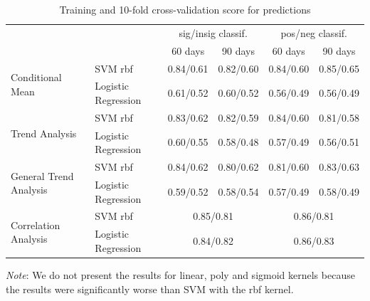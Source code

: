 \documentclass{vldb}
\begin{document}
\begin{table}[ht!]
\centering
\begin{tabular}{@{}llrrrr@{}}
\toprule
                                                              &                     & \multicolumn{2}{c}{sig/insig classif.} & \multicolumn{2}{c}{pos/neg classif.} \\ 
\cmidrule(r){3-4}
\cmidrule(r){5-6}
                                                              &                     & \multicolumn{1}{c}{60 days} & \multicolumn{1}{c}{90 days} & \multicolumn{1}{c}{60 days} & \multicolumn{1}{c}{90 days} \\ \midrule
\multirow{2}{*}{Conditional Mean}  & SVM rbf             &   0.84/0.61   &  0.82/0.60  & 0.84/0.60 &  0.85/0.65  \\
                                        & Logistic Regression & 0.61/0.52  & 0.60/0.52 &  0.56/0.49   &  0.56/0.49   \\ \midrule
\multirow{2}{*}{Trend Analysis}       & SVM rbf             & 0.83/0.62    &  0.82/0.59 & 0.84/0.60 & 0.81/0.58   \\
                                        & Logistic Regression &  0.60/0.55   & 0.58/0.48 &  0.57/0.49  &  0.56/0.51   \\ \midrule
\multirow{2}{*}{General Trend Analysis} & SVM rbf             & 0.84/0.62 & 0.80/0.62 &  0.81/0.60 &  0.83/0.63  \\
                                       & Logistic Regression &  0.59/0.52  & 0.58/0.54  &   0.57/0.49  &   0.58/0.49       \\ \midrule
\multirow{2}{*}{Correlation Analysis}   & SVM rbf             & \multicolumn{2}{c}{0.85/0.81}  & \multicolumn{2}{c}{0.86/0.81} \\
                                        & Logistic Regression & \multicolumn{2}{c}{0.84/0.82}  & \multicolumn{2}{c}{0.86/0.83} \\
\bottomrule
\end{tabular}
\caption{Training and 10-fold cross-validation score for predictions}
\end{table}

\textit{Note}: We do not present the results for linear, poly and sigmoid kernels because the results were significantly worse than SVM with the rbf kernel.
\end{document}

